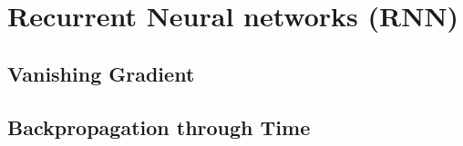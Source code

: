 \section{Recurrent Neural networks (RNN)}\label{sec:rnn}

\subsection{Vanishing Gradient}

\subsection{Backpropagation through Time}